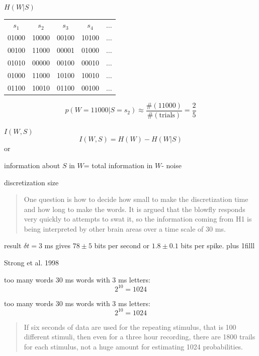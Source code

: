 \documentclass{beamer}
\newcommand{\btVFill}{\vskip0pt plus 1filll}
\newcommand{\crish}{\color{reddish}}
\newcommand{\cbla}{\color{black}}
\newcommand{\cblu}{\color{blue}}
\begin{document}
\begin{frame}{$H(W|S)$}
  \begin{tabular}{ccccc}
   $s_1$&$s_2$&$s_3$&$s_4$&$\ldots$\\  
   01000&\cblu{}10000\cbla{}&00100&10100&$\ldots$\\
   00100&\cblu{}11000\cbla{}&00001&01000&$\ldots$\\
   01010&\cblu{}00000\cbla{}&00100&00010&$\ldots$\\
   01000&\cblu{}11000\cbla{}&10100&10010&$\ldots$\\
   01100&\cblu{}10010\cbla{}&01100&00100&$\ldots$
  \end{tabular}
  \cblu
  $$
  p(W=11000|S=s_2)\approx\frac{\#(11000)}{\#(\mbox{trials})}=\frac{2}{5}
  $$
  \cbla
\end{frame}


\begin{frame}{$I(W,S)$}
  \crish
  $$I(W,S)=H(W)-H(W|S)$$
  \cbla
  or
  \begin{center}
    information about \crish$S$\cbla{} in \crish$W$\cbla= total information  in \crish$W$\cbla - noise
  \end{center}
\end{frame}

\begin{frame}{discretization size}
  \begin{quote}
One question is how to decide how small to make the discretization time and how long to make the words. It is argued that the blowfly responds very quickly to attempts to swat it, so the information coming from H1 is being interpreted by other brain areas over a time scale of 30 ms.
  \end{quote}
\end{frame}


\begin{frame}{result}
\vskip 2cm
\cblu $\delta t=3$ ms\cbla{} gives \cblu $78\pm 5$ bits per second \cbla or \cblu $1.8\pm 0.1$ bits per spike\cbla. 
\btVFill
\begin{flushright}
\tiny{Strong et al. 1998}
\end{flushright}
\end{frame}


\begin{frame}{too many words}
  30 ms words with 3 ms letters:
  \crish
  $$
  2^{10}=1024
  $$ \cbla
\end{frame}


\begin{frame}{too many words}
  30 ms words with 3 ms letters:
  \crish
  $$
  2^{10}=1024
  $$ \cbla
  \begin{quote}
  If six seconds of data are used for the repeating stimulus, that is 100 different stimuli, then even for a three hour recording, there are 1800 trails for each stimulus, not a huge amount for estimating 1024 probabilities.
  \end{quote}
\end{frame}
\end{document}
